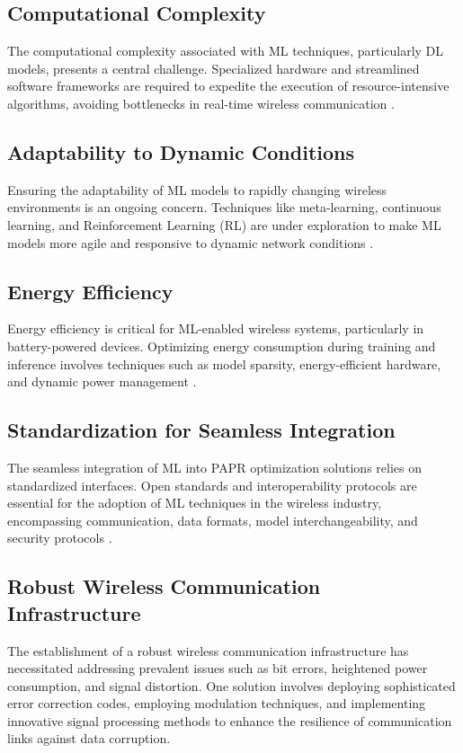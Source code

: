 \documentclass[conference]{IEEEtran}
\begin{document}
\subsection{Computational Complexity}
The computational complexity associated with ML techniques, particularly DL models, presents a central challenge. Specialized hardware and streamlined software frameworks are required to expedite the execution of resource-intensive algorithms, avoiding bottlenecks in real-time wireless communication \cite{b173, b174}.

\subsection{Adaptability to Dynamic Conditions}
Ensuring the adaptability of ML models to rapidly changing wireless environments is an ongoing concern. Techniques like meta-learning, continuous learning, and Reinforcement Learning (RL) are under exploration to make ML models more agile and responsive to dynamic network conditions \cite{b175, b176}.

\subsection{Energy Efficiency}
Energy efficiency is critical for ML-enabled wireless systems, particularly in battery-powered devices. Optimizing energy consumption during training and inference involves techniques such as model sparsity, energy-efficient hardware, and dynamic power management \cite{b177, b178, b179}.

\subsection{Standardization for Seamless Integration}
The seamless integration of ML into PAPR optimization solutions relies on standardized interfaces. Open standards and interoperability protocols are essential for the adoption of ML techniques in the wireless industry, encompassing communication, data formats, model interchangeability, and security protocols \cite{b180, b181}.

\subsection{Robust Wireless Communication Infrastructure}
The establishment of a robust wireless communication infrastructure has necessitated addressing prevalent issues such as bit errors, heightened power consumption, and signal distortion. One solution involves deploying sophisticated error correction codes, employing modulation techniques, and implementing innovative signal processing methods to enhance the resilience of communication links against data corruption.
\end{document}
